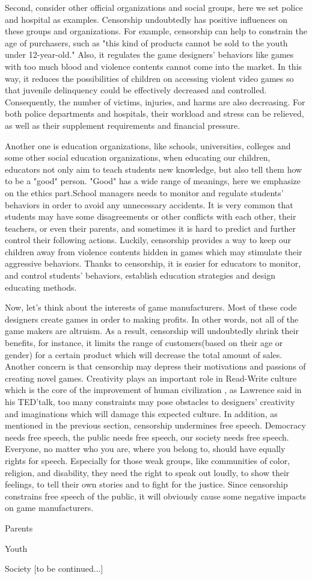 Second, consider other official organizations and social groups, here we set police and hospital as examples. Censorship undoubtedly has positive influences on these groups and organizations. For example, censorship can help to constrain the age of purchasers, such as "this kind of products cannot be sold to the youth under 12-year-old." Also, it regulates the game designers' behaviors like games with too much blood and violence contents cannot come into the market. In this way, it reduces the possibilities of children on accessing violent video games so that juvenile delinquency could be effectively decreased and controlled. Consequently, the number of victims, injuries, and harms are also decreasing. For both police departments and hospitals, their workload and stress can be relieved, as well as their supplement requirements and financial pressure.

Another one is education organizations, like schools, universities, colleges and some other social education organizations, when educating our children, educators not only aim to teach students new knowledge, but also tell them how to be a "good" person. "Good" has a wide range of meanings, here we emphasize on the ethics part.School managers needs to monitor and regulate students' behaviors in order to avoid any unnecessary accidents. It is very common that students may have some disagreements or other conflicts with each other, their teachers, or even their parents, and sometimes it is hard to predict and further control their following actions. Luckily, censorship provides a way to keep our children away from violence contents hidden in games which may stimulate their aggressive behaviors. Thanks to censorship, it is easier for educators to monitor, and control students' behaviors, establish education strategies and design educating methods.  

Now, let's think about the interests of game manufacturers. Most of these code designers create games in order to making profits. In other words,  not all of the game makers are altruism. As a result, censorship will undoubtedly shrink their benefits, for instance, it limits the range of customers(based on their age or gender) for a certain product which will decrease the total amount of sales. Another concern is that censorship may depress their motivations and passions of creating novel games. Creativity plays an important role in Read-Write culture which is the core of the improvement of human civilization , as Lawrence said in his TED'talk, too many constraints may pose obstacles to designers' creativity and imaginations which will damage this expected culture. In addition, as mentioned in the previous section, censorship undermines free speech. Democracy needs free speech, the public needs free speech, our society needs free speech. Everyone, no matter who you are, where you belong to, should have equally rights for speech. Especially for those weak groups, like communities of color, religion, and disability, they need the right to speak out loudly, to show their feelings, to tell their own stories and to fight for the justice. Since censorship constrains free speech of the public, it will obviously cause some negative impacts on game manufacturers.

Parents

Youth

Society
[to be continued...]









